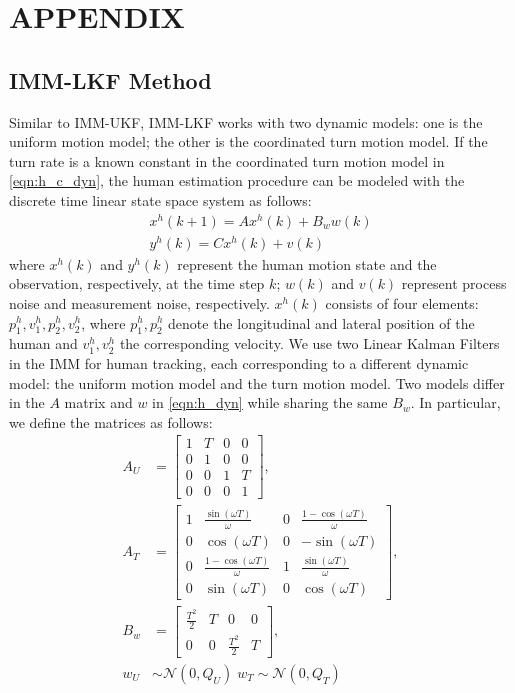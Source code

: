 \documentclass[letterpaper, 10 pt, conference]{ieeeconf}
\begin{document}
	
	\section*{APPENDIX}
	\subsection{IMM-LKF Method}
	Similar to IMM-UKF, IMM-LKF works with two dynamic models: one is the uniform motion model; the other is the coordinated turn motion model. If the turn rate is a known constant in the coordinated turn motion model in \cref{eqn:h_c_dyn}, the human estimation procedure can be modeled with the discrete time linear state space system as follows:
	\begin{subequations}
		\begin{align}
			x^h(k+1) = Ax^h(k)+B_ww(k)\label{eqn:h_dyn}\\
			y^h(k)=Cx^h(k)+v(k)\label{eqn:observation}
		\end{align}
	\end{subequations}
	where $x^h(k)$ and $y^h(k)$ represent the human motion state and the observation, respectively, at the time step $k$; $w(k)$ and $v(k)$ represent process noise and measurement noise, respectively.
	$x^h(k)$ consists of four elements: $p^h_1,v^h_1,p^h_2,v^h_2$, where $p^h_1,p^h_2$ denote the longitudinal and lateral position of the human and $v^h_1,v^h_2$ the corresponding velocity.
	We use two Linear Kalman Filters in the IMM for human tracking, each corresponding to a different dynamic model: the uniform motion model and the turn motion model.
	Two models differ in the $A$ matrix and $w$ in \cref{eqn:h_dyn} while sharing the same $B_w$.
	In particular, we define the matrices as follows:
	\begin{subequations}
		\begin{align*}
			A_U&=\left[
			\begin{array}{cccc}
				1& T& 0& 0\\
				0& 1& 0& 0\\
				0& 0& 1& T\\
				0& 0& 0& 1
			\end{array}\right],\\
			A_T&=\left[
			\begin{array}{cccc}
				1& \frac{\sin(\omega T)}{\omega}& 0& \frac{1-\cos(\omega T)}{\omega}\\
				0& \cos(\omega T)& 0& -\sin(\omega T)\\
				0& \frac{1-\cos(\omega T)}{\omega}& 1& \frac{\sin(\omega T)}{\omega}\\
				0& \sin(\omega T)& 0& \cos(\omega T)
			\end{array}\right],\\
			B_w&=\left[
			\begin{array}{cccc}
				\frac{T^2}{2}& T& 0& 0\\
				0& 0& \frac{T^2}{2}& T
			\end{array}\right],\\
			w_U&\sim\mathcal{N}(0,Q_U)\; w_T\sim\mathcal{N}(0,Q_T)
		\end{align*}
	\end{subequations}
\end{document}
